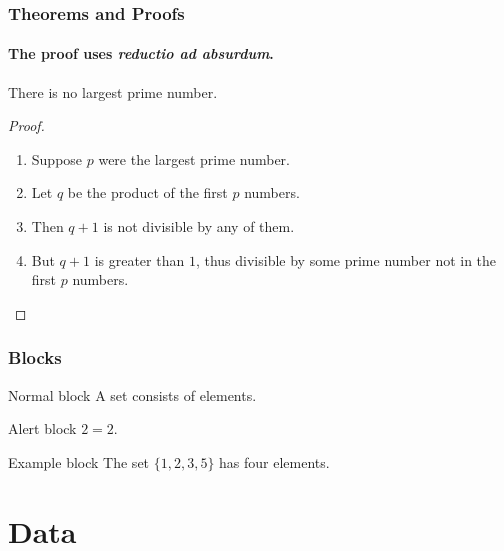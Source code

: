 \documentclass[UTF8, aspectratio=169 , 10pt，punct=kaiming]{beamer} %
\begin{document}
\begin{frame}
  \frametitle{Theorems and Proofs}
  \framesubtitle{The proof uses \textit{reductio ad absurdum}.}
  
  \begin{theorem}
    There is no largest prime number.
  \end{theorem}

  \begin{proof}
    \begin{enumerate}
      \item<1-| alert@1> Suppose $p$ were the largest prime number.
      \item<2-> Let $q$ be the product of the first $p$ numbers.
      \item<3-> Then $q+1$ is not divisible by any of them.
      \item<1-> But $q + 1$ is greater than $1$, thus divisible by some prime
      number not in the first $p$ numbers.\qedhere
    \end{enumerate}
  \end{proof}
  \end{frame}

  \begin{frame}
    \frametitle{Blocks}
  
    \begin{block}{Normal block}
  A \alert{set} consists of elements.
  \end{block}
  
  \begin{alertblock}{Alert block}
  $2=2$.
  \end{alertblock}
  
  \begin{exampleblock}{Example block}
  The set $\{1,2,3,5\}$ has four elements.
  \end{exampleblock}
  
  \end{frame}

\section{Data}
\end{document}
